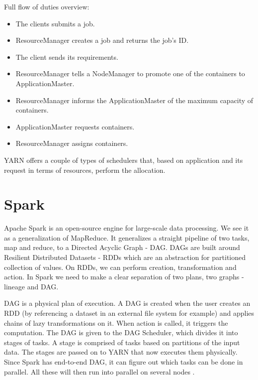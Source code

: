 Full flow of duties overview:
\begin{itemize}
	\item The clients submits a job. 
	\item ResourceManager creates a job and returns the job's ID. 
	\item The client sends its requirements. 
	\item ResourceManager tells a NodeManager to promote one of the containers to ApplicationMaster. 
	\item ResourceManager informs the ApplicationMaster of the maximum capacity of containers. 
	\item ApplicationMaster requests containers. 
	\item ResourceManager assigns containers.
\end{itemize}


YARN offers a couple of types of schedulers that, based on application and its request in terms of resources, perform the allocation.

\section{Spark}
Apache Spark \cite{ApacheSpark} \cite{SparkDefinitiveGuide} \cite{LearningSpark} is an open-source engine for large-scale data processing. We see it as a generalization of MapReduce. It generalizes a straight pipeline of two tasks, map and reduce, to a Directed Acyclic Graph - DAG. DAGs are built around Resilient Distributed Datasets - RDDs \cite{RDD} which are an abstraction for partitioned collection of values. On RDDs, we can perform creation, transformation and action. In Spark we need to make a clear separation of two plans, two graphs - lineage and DAG.

DAG is a physical plan of execution. A DAG is created when the user creates an RDD (by referencing a dataset in an external file system for example) and applies chains of lazy transformations on it. When action is called, it triggers the computation. The DAG is given to the DAG Scheduler, which divides it into stages of tasks. A stage is comprised of tasks based on partitions of the input data. The stages are passed on to YARN that now executes them physically. Since Spark has end-to-end DAG, it can figure out which tasks can be done in parallel. All these will then run into parallel on several nodes \cite{BigDataCourse}. %

